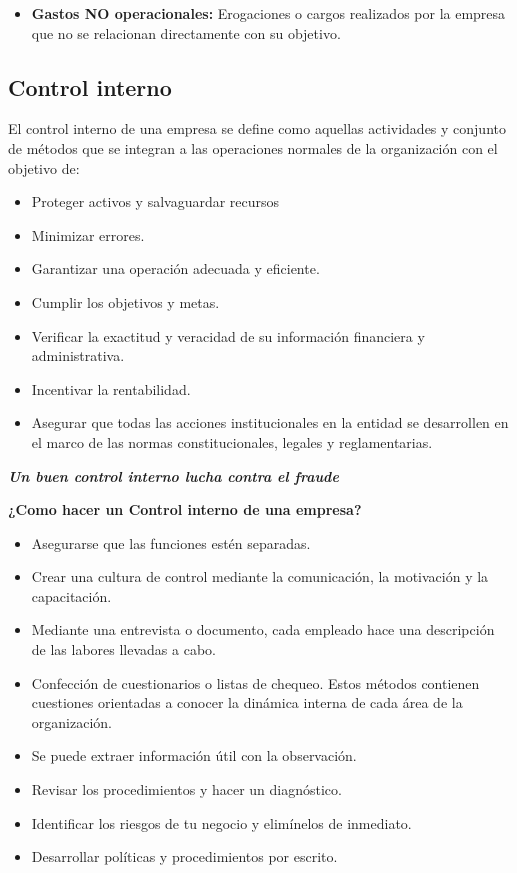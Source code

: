 \documentclass[letter,12pt]{article}
\begin{document}
\begin{itemize}
			    \item \textbf{Gastos NO operacionales: } Erogaciones o cargos realizados por la empresa que no se relacionan directamente con su objetivo.
			\end{itemize}
	
		\subsection{Control interno}
		El control interno de una empresa se define como aquellas actividades y conjunto de métodos que se integran a las operaciones normales de la organización con el objetivo de:
		\begin{itemize}
			\item Proteger activos y salvaguardar recursos
			\item Minimizar errores.
			\item Garantizar una operación adecuada y eficiente.
			\item Cumplir los objetivos y metas.
			\item Verificar la exactitud y veracidad de su información financiera y administrativa.
			\item Incentivar la rentabilidad.
			\item Asegurar que todas las acciones institucionales en la entidad se desarrollen en el marco de las normas constitucionales, legales y reglamentarias.
		\end{itemize}
		\begin{center}
			\textbf{\textit{Un buen control interno lucha contra el fraude}}
		\end{center}
	
		\textbf{¿Como hacer un Control interno de una empresa?}
		\begin{itemize}
			\item Asegurarse que las funciones estén separadas.
			\item Crear una cultura de control mediante la comunicación, la motivación y la capacitación.
			\item Mediante una entrevista o documento, cada empleado hace una descripción de las labores llevadas a cabo.
			\item Confección de cuestionarios o listas de chequeo. Estos métodos contienen cuestiones orientadas a conocer la dinámica interna de cada área de la organización.
			\item Se puede extraer información útil con la observación.
			\item Revisar los procedimientos y hacer un diagnóstico.
			\item Identificar los riesgos de tu negocio y elimínelos de inmediato.
			\item Desarrollar políticas y procedimientos por escrito.
		\end{itemize}
	
\end{document}
